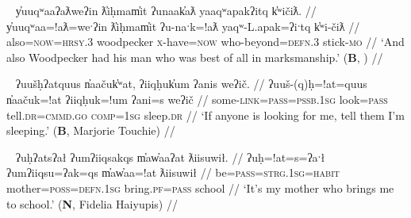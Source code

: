 \begin{comment}
\ex \label{ex:doubleatl2}
\begingl
\glpreamble ʔuḥʔaƛ tiic̓̌ap̓aƛ hałmiiḥa. //
\gla ʔuḥ=!aƛ tiic=!ap=!aƛ hałmiiḥa  //
\glb be=\textsc{now} alive.\textsc{dr}=\textsc{caus}=\textsc{now} drown.\textsc{cv} //
\glft `He made him alive from drowning.' (\textbf{C}, \textit{tupaat} Julia Lucas) //
\endgl
\xe
\end{comment}

\ex~ \label{ex:doubleatlyuuqwaa}
\begingl
\glpreamble y̓uuqʷaaʔaƛweʔin ƛ̓iḥmam̓it ʔunaak̓aƛ yaaqʷapakʔitq k̓ʷičiƛ. //
\gla y̓uuqʷaa=!aƛ=weˑʔin ƛ̓iḥmam̓it ʔu-naˑk=!aƛ yaqʷ-L.apak=ʔiˑtq k̓ʷi-čiƛ  //
\glb also=\textsc{now}=\textsc{hrsy.3} woodpecker \textsc{x}-have=\textsc{now} who-beyond=\textsc{defn.3} stick-\textsc{mo} //
\glft `And also Woodpecker had his man who was best of all in marksmanship.' (\textbf{B}, \citealt[50]{sapir1939}) //
\endgl
\xe


\begin{comment}
\ex~ \label{ex:doubleap}
\begingl
\glpreamble hišuk̓ap̓aƛ witkʷaaʔap ʔin wikmaḥsap̓aƛ, ḥaakʷaaƛsma. //
\gla hišuk=!ap=!aƛ witkʷaa=!ap ʔin wik-maḥsa=!ap=!aƛ, ḥaakʷaaƛ-sma  //
\glb all=\textsc{caus}=\textsc{now} destroy=\textsc{caus} \textsc{comp} \textsc{neg}-want.to=\textsc{caus}=\textsc{caus} young.woman-protective.of //
\glft `Everyone destroyed the wharf because they wanted her to marry, they were stingy of the girl.' (\textbf{C}, \textit{tupaat} Julia Lucas) //
\endgl
\xe
\end{comment}


\ex~ \label{ex:doubleatuush}
\begingl
\glpreamble ʔuušḥʔatquus n̓aačuk̓ʷat, ʔiiqḥuk̓um ʔanis weʔič. //
\gla ʔuuš-(q)ḥ=!at=quus n̓aačuk=!at ʔiiqḥuk=!um ʔani=s weʔič  //
\glb some-\textsc{link}=\textsc{pass}=\textsc{pssb.1sg} look=\textsc{pass} tell.\textsc{dr}=\textsc{cmmd.go} \textsc{comp}=\textsc{1sg} sleep.\textsc{dr} //
\glft `If anyone is looking for me, tell them I'm sleeping.' (\textbf{B}, Marjorie Touchie) //
\endgl
\xe

\ex~ \label{ex:doubleatuh}
\begingl
\glpreamble ʔuḥʔatsʔał ʔumʔiiqsakqs m̓aw̓aaʔat ƛiisuwił. //
\gla ʔuḥ=!at=s=ʔaˑł ʔumʔiiqsu=ʔak=qs m̓aw̓aa=!at ƛiisuwił  //
\glb be=\textsc{pass}=\textsc{strg.1sg}=\textsc{habit} mother=\textsc{poss}=\textsc{defn.1sg} bring.\textsc{pf}=\textsc{pass} school //
\glft `It's my mother who brings me to school.' (\textbf{N}, Fidelia Haiyupis) //
\endgl
\xe

